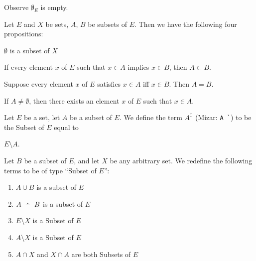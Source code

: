 \documentclass{article}
\begin{document}
Observe $\emptyset_{E}$ is empty.

Let $E$ and $X$ be sets, $A$, $B$ be subsets of $E$. Then we have the
following four propositions:
\begin{thm}
\item\label{subset1:1} $\emptyset$ is a subset of $X$
\item\label{subset1:2} If every element $x$ of $E$ such that $x\in A$
  implies $x\in B$, then $A\subset B$.
\item\label{subset1:3} Suppose every element $x$ of $E$ satisfies $x\in A$
  iff $x\in B$. Then $A=B$.
\item\label{subset1:4} If $A\neq\emptyset$, then there exists an element
  $x$ of $E$ such that $x\in A$.
\end{thm}

\begin{definition}
Let $E$ be a set, let $A$ be a subset of $E$.
We define the term $A^{\complement}$ (Mizar: \verb#A `#) to be the
Subset of $E$ equal to
\begin{defn}
\item $E\setminus A$.
\end{defn}
Let $B$ be a subset of $E$, and let $X$ be any arbitrary set.
We redefine the following terms to be of
type ``Subset of $E$'':
\begin{enumerate}
\item $A\cup B$ is a subset of $E$
\item $A\symdiff B$ is a subset of $E$
\item $E\setminus X$ is a Subset of $E$
\item $A\setminus X$ is a Subset of $E$
\item $A\cap X$ and $X\cap A$ are both Subsets of $E$
\end{enumerate}
\end{definition}

\medbreak
\end{document}
